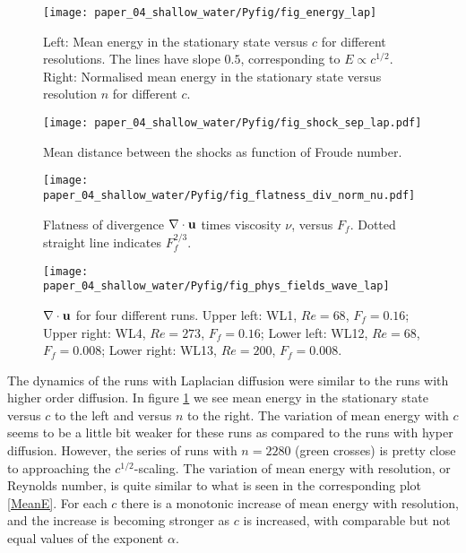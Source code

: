 \begin{figure}
\centerline{\texttt{[image: paper\_04\_shallow\_water/Pyfig/fig\_energy\_lap]}}
\caption{Left: Mean energy in the stationary state versus $ c $ for different
resolutions. The lines have slope $ 0.5 $, corresponding to $ E \propto c^{1/2}
$. Right: Normalised mean energy in the stationary state versus resolution $ n
$ for different $ c $.}
\label{MeanE2}
\end{figure}

\begin{figure}
\centerline{\texttt{[image: paper\_04\_shallow\_water/Pyfig/fig\_shock\_sep\_lap.pdf]}}
\caption{Mean distance between the shocks as function of Froude number.  }
\label{fig_distance_lap}
\end{figure}


\begin{figure}
\centerline{\texttt{[image: paper\_04\_shallow\_water/Pyfig/fig\_flatness\_div\_norm\_nu.pdf]}}
\caption{Flatness of divergence $ \nabla \cdot {\bf u} $ times viscosity $ \nu $, versus $ F_f $. Dotted straight line indicates $ F_f^{2/3} $. }
\label{FlatnessDiv}
\end{figure}

\begin{figure}
\centerline{\texttt{[image: paper\_04\_shallow\_water/Pyfig/fig\_phys\_fields\_wave\_lap]}}
\caption{$ \nabla \cdot {\bf u} $ for four different runs. Upper left: WL1, $ Re = 68 $, $ F_f = 0.16 $; Upper right: WL4,  $ Re = 273 $, $ F_f = 0.16 $; Lower left: WL12, $ Re = 68 $, $ F_f = 0.008 $; Lower right: WL13,  $ Re = 200 $, $ F_f = 0.008 $.}
\label{Physical_lap}
\end{figure}




The dynamics of the runs with Laplacian diffusion were similar to the runs with higher order diffusion. In figure \ref{MeanE2} we see mean energy in the stationary state versus $ c $ to the left and versus $ n $ to the right. 
The variation of mean energy with $ c $ seems to be a little bit weaker for these runs as compared to the runs with hyper diffusion. However, the series of runs with $ n = 2280 $ (green crosses) is pretty close to approaching the $ c^{1/2} $-scaling.
The variation of mean energy with resolution, or Reynolds number, is quite similar to what is seen in the corresponding plot \ref{MeanE}. For each $ c $ there is a monotonic increase of mean energy with resolution, and the increase is becoming stronger as $ c $ is increased, with comparable but not equal values of the exponent $ \alpha $.  


